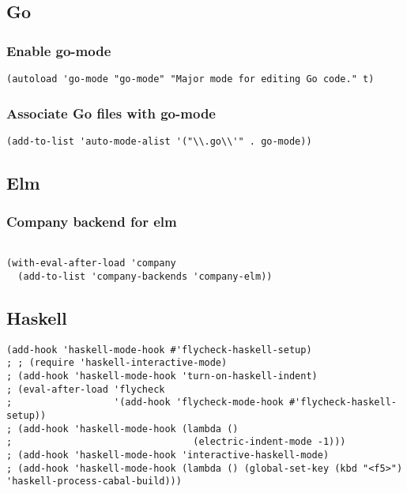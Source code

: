 \documentclass[11pt]{article}
\begin{document}
\subsection*{Go}
\label{sec:org052f118}

\subsubsection*{Enable go-mode}
\label{sec:orgba97b4e}
\begin{verbatim}
(autoload 'go-mode "go-mode" "Major mode for editing Go code." t)
\end{verbatim}

\subsubsection*{Associate Go files with go-mode}
\label{sec:org20a3058}
\begin{verbatim}
(add-to-list 'auto-mode-alist '("\\.go\\'" . go-mode))
\end{verbatim}

\subsection*{Elm}
\label{sec:org7143fc9}
\subsubsection*{Company backend for elm}
\label{sec:org1af8320}
\begin{verbatim}

(with-eval-after-load 'company
  (add-to-list 'company-backends 'company-elm))

\end{verbatim}

\subsection*{Haskell}
\label{sec:org0027f85}
\begin{verbatim}
(add-hook 'haskell-mode-hook #'flycheck-haskell-setup)
; ; (require 'haskell-interactive-mode)
; (add-hook 'haskell-mode-hook 'turn-on-haskell-indent)
; (eval-after-load 'flycheck
;                  '(add-hook 'flycheck-mode-hook #'flycheck-haskell-setup))
; (add-hook 'haskell-mode-hook (lambda ()
;                                (electric-indent-mode -1)))
; (add-hook 'haskell-mode-hook 'interactive-haskell-mode)
; (add-hook 'haskell-mode-hook (lambda () (global-set-key (kbd "<f5>") 'haskell-process-cabal-build)))
\end{verbatim}
\end{document}
